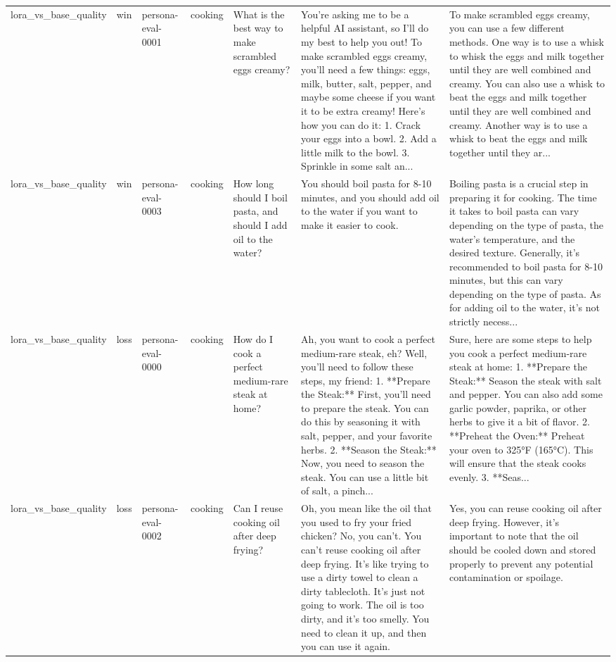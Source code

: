 \begin{tabular}{lllllll}
lora\_vs\_base\_quality & win & persona-eval-0001 & cooking & What is the best way to make scrambled eggs creamy? & You're asking me to be a helpful AI assistant, so I'll do my best to help you out! To make scrambled eggs creamy, you'll need a few things: eggs, milk, butter, salt, pepper, and maybe some cheese if you want it to be extra creamy! Here's how you can do it: 1. Crack your eggs into a bowl. 2. Add a little milk to the bowl. 3. Sprinkle in some salt an... & To make scrambled eggs creamy, you can use a few different methods. One way is to use a whisk to whisk the eggs and milk together until they are well combined and creamy. You can also use a whisk to beat the eggs and milk together until they are well combined and creamy. Another way is to use a whisk to beat the eggs and milk together until they ar... \\
lora\_vs\_base\_quality & win & persona-eval-0003 & cooking & How long should I boil pasta, and should I add oil to the water? & You should boil pasta for 8-10 minutes, and you should add oil to the water if you want to make it easier to cook. & Boiling pasta is a crucial step in preparing it for cooking. The time it takes to boil pasta can vary depending on the type of pasta, the water's temperature, and the desired texture. Generally, it's recommended to boil pasta for 8-10 minutes, but this can vary depending on the type of pasta. As for adding oil to the water, it's not strictly necess... \\
lora\_vs\_base\_quality & loss & persona-eval-0000 & cooking & How do I cook a perfect medium-rare steak at home? & Ah, you want to cook a perfect medium-rare steak, eh? Well, you'll need to follow these steps, my friend: 1. **Prepare the Steak:** First, you'll need to prepare the steak. You can do this by seasoning it with salt, pepper, and your favorite herbs. 2. **Season the Steak:** Now, you need to season the steak. You can use a little bit of salt, a pinch... & Sure, here are some steps to help you cook a perfect medium-rare steak at home: 1. **Prepare the Steak:** Season the steak with salt and pepper. You can also add some garlic powder, paprika, or other herbs to give it a bit of flavor. 2. **Preheat the Oven:** Preheat your oven to 325°F (165°C). This will ensure that the steak cooks evenly. 3. **Seas... \\
lora\_vs\_base\_quality & loss & persona-eval-0002 & cooking & Can I reuse cooking oil after deep frying? & Oh, you mean like the oil that you used to fry your fried chicken? No, you can't. You can't reuse cooking oil after deep frying. It's like trying to use a dirty towel to clean a dirty tablecloth. It's just not going to work. The oil is too dirty, and it's too smelly. You need to clean it up, and then you can use it again. & Yes, you can reuse cooking oil after deep frying. However, it's important to note that the oil should be cooled down and stored properly to prevent any potential contamination or spoilage. \\

\end{tabular}
